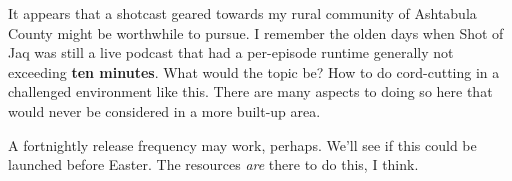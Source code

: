 It appears that a shotcast geared towards my rural community of
Ashtabula County might be worthwhile to pursue. I remember the olden
days when Shot of Jaq was still a live podcast that had a per-episode
runtime generally not exceeding \textbf{ten minutes}. What would the
topic be? How to do cord-cutting in a challenged environment like this.
There are many aspects to doing so here that would never be considered
in a more built-up area.

A fortnightly release frequency may work, perhaps. We'll see if this
could be launched before Easter. The resources \emph{are} there to do
this, I think.
